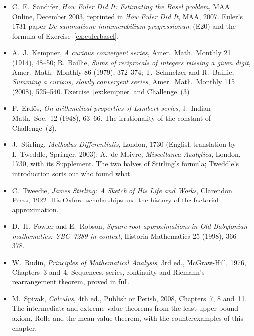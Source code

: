 \begin{itemize}
\item C.~E.~Sandifer, \emph{How Euler Did It: Estimating the Basel problem}, MAA Online, December 2003, reprinted in \emph{How Euler Did It}, MAA, 2007. Euler's 1731 paper \emph{De summatione innumerabilium progressionum} (E20) and the formula of Exercise~\ref{ex:eulerbasel}.
\item A.~J.~Kempner, \emph{A curious convergent series}, Amer.\ Math.\ Monthly 21 (1914), 48--50; R.~Baillie, \emph{Sums of reciprocals of integers missing a given digit}, Amer.\ Math.\ Monthly 86 (1979), 372--374; T.~Schmelzer and R.~Baillie, \emph{Summing a curious, slowly convergent series}, Amer.\ Math.\ Monthly 115 (2008), 525--540. Exercise~\ref{ex:kempner} and Challenge~(3).
\item P.~Erd\H{o}s, \emph{On arithmetical properties of Lambert series}, J.\ Indian Math.\ Soc.\ 12 (1948), 63--66. The irrationality of the constant of Challenge~(2).
\item J.~Stirling, \emph{Methodus Differentialis}, London, 1730 (English translation by I.~Tweddle, Springer, 2003); A.~de Moivre, \emph{Miscellanea Analytica}, London, 1730, with its Supplement. The two halves of Stirling's formula; Tweddle's introduction sorts out who found what.
\item C.~Tweedie, \emph{James Stirling: A Sketch of His Life and Works}, Clarendon Press, 1922. His Oxford scholarships and the history of the factorial approximation.
\item D.~H.~Fowler and E.~Robson, \emph{Square root approximations in Old Babylonian mathematics: YBC~7289 in context}, Historia Mathematica 25 (1998), 366--378.
\item W.~Rudin, \emph{Principles of Mathematical Analysis}, 3rd ed., McGraw-Hill, 1976, Chapters~3 and~4. Sequences, series, continuity and Riemann's rearrangement theorem, proved in full.
\item M.~Spivak, \emph{Calculus}, 4th ed., Publish or Perish, 2008, Chapters~7, 8 and~11. The intermediate and extreme value theorems from the least upper bound axiom, Rolle and the mean value theorem, with the counterexamples of this chapter.
\end{itemize}
